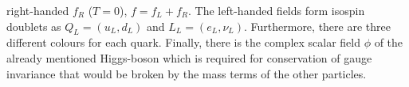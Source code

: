 right-handed $f_R$ ($T=0$), $f=f_L+f_R$. The left-handed fields form isospin doublets as $Q_L=(u_L,d_L)$
and $L_L=(e_L,\nu_L)$. Furthermore, there are three different colours for each quark. 
Finally, there is the complex scalar field $\phi$ of the already mentioned Higgs-boson which is required for conservation of gauge invariance 
that would be broken by the mass terms of the other particles.
